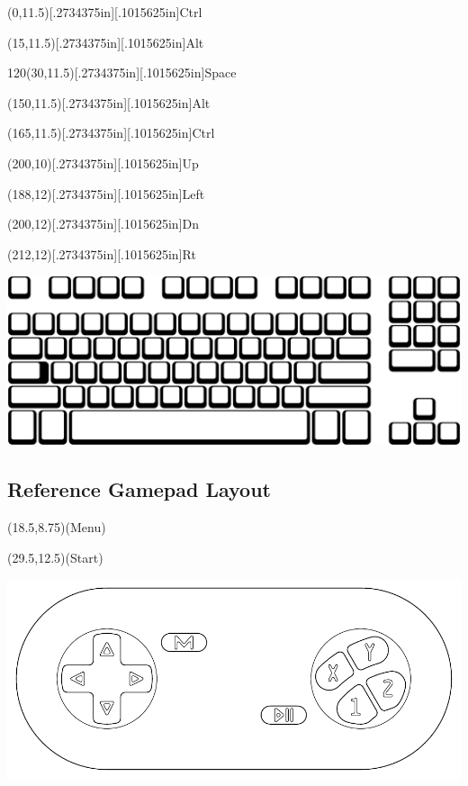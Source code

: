 \documentclass[12pt]{{memoir}}
\newcommand\keycaps[1]{\raisebox{0in}[.2734375in][.1015625in]{\tiny\textsf{#1}}}
\begin{document}
\begin{center}
\begin{textblock}{15}(0,11.5)\keycaps{Ctrl}\end{textblock}
\begin{textblock}{15}(15,11.5)\keycaps{Alt}\end{textblock}
\begin{textblock}{120}(30,11.5)\keycaps{Space}\end{textblock}
\begin{textblock}{15}(150,11.5)\keycaps{Alt}\end{textblock}
\begin{textblock}{15}(165,11.5)\keycaps{Ctrl}\end{textblock}
\begin{textblock}{12}(200,10)\keycaps{Up}\end{textblock}
\begin{textblock}{12}(188,12)\keycaps{Left}\end{textblock}
\begin{textblock}{12}(200,12)\keycaps{Dn}\end{textblock}
\begin{textblock}{12}(212,12)\keycaps{Rt}\end{textblock}
\includegraphics[width=7in]{keyboard}
\end{center}

\pagebreak[4]
\subsection{Reference Gamepad Layout}

\setlength\TPHorizModule{.125in}
\setlength\TPVertModule{.125in}
\nopagebreak\begin{center}\nopagebreak
\begin{textblock}{8}(18.5,8.75)\textsf{(Menu)}\end{textblock}
\begin{textblock}{8}(29.5,12.5)\textsf{(Start)}\end{textblock}
\includegraphics{gamepad}
\end{center}
\end{document}
